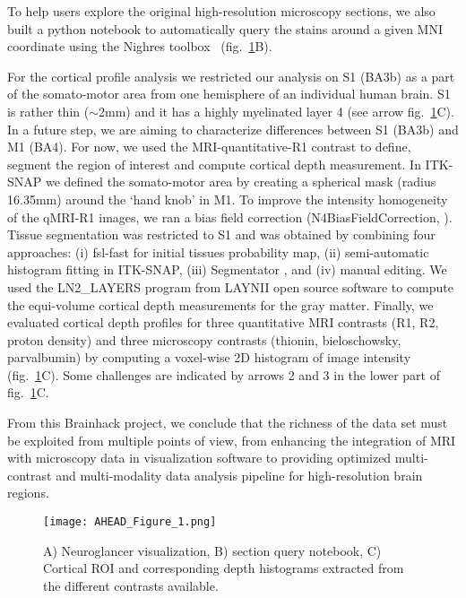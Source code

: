 \documentclass[../main.tex]{subfiles}
\begin{document}
To help users explore the original high-resolution microscopy sections, we also built a python notebook to automatically query the stains around a given MNI coordinate using the Nighres toolbox~\parencite{huntenburg_nighres_2018} (fig.~\ref{fig:test}B).

For the cortical profile analysis we restricted our analysis on S1 (BA3b) as a part of the somato-motor area from one hemisphere of an individual human brain. S1 is rather thin (\(\sim\)2mm) and it has a highly myelinated layer 4 (see arrow fig.~\ref{fig:test}C). In a future step, we are aiming to characterize differences between S1 (BA3b) and M1 (BA4). For now, we used the MRI-quantitative-R1 contrast to define, segment the region of interest and compute cortical depth measurement. In ITK-SNAP \parencite{Yushkevich2006} we defined the somato-motor area by creating a spherical mask (radius 16.35mm) around the ‘hand knob’ in M1. To improve the intensity homogeneity of the qMRI-R1 images, we ran a bias field correction (N4BiasFieldCorrection, \parencite{Cox1996}). Tissue segmentation was restricted to S1 and was obtained by combining four approaches: (i) fsl-fast \parencite{Smith2004} for initial tissues probability map, (ii) semi-automatic histogram fitting in ITK-SNAP, (iii) Segmentator \parencite{Gulban2018}, and (iv) manual editing. We used the LN2\_LAYERS program from LAYNII open source software \parencite{Huber2021}  to compute the equi-volume cortical depth measurements for the gray matter. Finally, we evaluated cortical depth profiles for three quantitative MRI contrasts (R1, R2, proton density) and three microscopy contrasts (thionin, bieloschowsky, parvalbumin) by computing a voxel-wise 2D histogram of image intensity (fig.~\ref{fig:test}C). Some challenges are indicated by arrows 2 and 3 in the lower part of fig.~\ref{fig:test}C.

From this Brainhack project, we conclude that the richness of the data set must be exploited from multiple points of view, from enhancing the integration of MRI with microscopy data in visualization software to providing optimized multi-contrast and multi-modality data analysis pipeline for high-resolution brain regions.

\printbibliography


\begin{figure}
	\centering
	\texttt{[image: AHEAD\_Figure\_1.png]}
	\caption{A) Neuroglancer visualization, B) section query notebook, C) Cortical ROI and corresponding depth histograms extracted from the different contrasts available.
	}
	\label{fig:test}
\end{figure}
\end{document}
